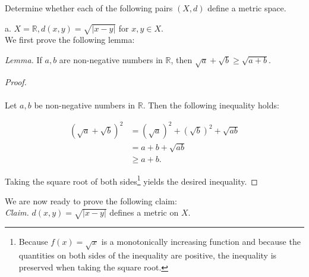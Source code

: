 Determine whether each of the following pairs $(X, d)$ define a metric space.

a.  $X = \mathbb{R}, d(x, y) = \sqrt{|x - y|}$ for $x, y \in X$. \ \\

    We first prove the following lemma:

    \emph{Lemma.} If $a, b$ are non-negative numbers in  $\mathbb{R}$, then
    $\sqrt{a} + \sqrt{b} \ge \sqrt{a + b}$.

    \begin{proof}\ \\\\
        Let $a,b$ be non-negative numbers in $\mathbb{R}$. Then the following inequality holds:

        \begin{align*}
            (\sqrt{a} + \sqrt{b})^2 &= (\sqrt{a})^2 + (\sqrt{b})^2 + \sqrt{ab} \\
                                    &= a + b + \sqrt{ab} \\
                                    &\ge a + b.
        \end{align*}

        Taking the square root of both sides\footnote{
            Because $f(x) = \sqrt{x}$ is a monotonically increasing function and because the quantities on both sides of the inequality are 
            positive, the inequality is preserved when taking the square root.
        } yields the desired inequality.
    \end{proof}

    We are now ready to prove the following claim:\ \\

    \emph{Claim.} $d(x, y) = \sqrt{|x - y|}$ defines a metric on $X$.

